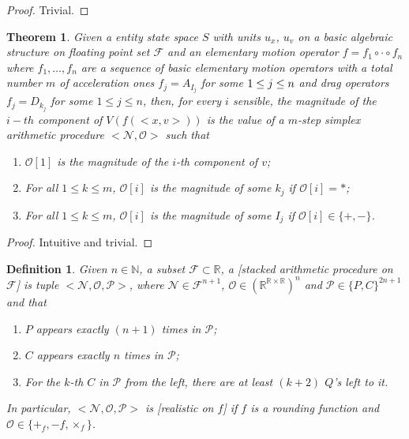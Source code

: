 \documentclass{book}
\newtheorem{definition}{Definition}
\newtheorem{theorem}{Theorem}
\theoremstyle{definition}\newtheorem{mechanism}{Mechanism}
\theoremstyle{remark}\newtheorem*{remark}{Remark}
\begin{document}
\begin{proof}
	Trivial.
\end{proof}

\begin{theorem}
	Given a entity state space $S$ with units $u_x$, $u_v$ on a basic algebraic structure on floating point set $\mathcal F$ and an elementary motion operator $f = f_1 \circ \cdot \circ f_n$ where $f_1, \dots, f_n$ are a sequence of basic elementary motion operators with a total number $m$ of acceleration ones $f_j = A_{I_j}$ for some $\\
	1\le j\le n$ and drag operators $f_j = D_{k_j}$ for some $1\le j\le n$, then, for every $i$ sensible, the magnitude of the $i-th$ component of $V(f(<x, v>))$ is the value of a $m$-step simplex arithmetic procedure $<\mathcal N, \mathcal O>$ such that
	
	\begin{enumerate}
		\item $\mathcal O[1]$ is the magnitude of the $i$-th component of $v$;
		\item For all $1\le k \le m$, $\mathcal O[i]$ is the magnitude of some $k_j$ if $\mathcal O[i] = *$;
		\item For all $1\le k \le m$, $\mathcal O[i]$ is the magnitude of some $I_j$ if $\mathcal O[i] \in \{ +, - \}$.
	\end{enumerate}
\end{theorem}

\begin{proof}
	Intuitive and trivial.
\end{proof}

\begin{definition}
	Given $n\in \mathbb N$, a subset $\mathcal F\subset \mathbb R$, a [stacked arithmetic procedure on $\mathcal F$] is tuple $<\mathcal N, \mathcal O, \mathcal P>$, where $\mathcal N \in \mathcal F^{n + 1}$, $\mathcal O\in (\mathbb R^{\mathbb R \times \mathbb R})^n$ and $\mathcal P\in \{ P, C \}^{2n + 1}$ and that
	
	\begin{enumerate}
		\item $P$ appears exactly $(n + 1)$ times in $\mathcal P$;
		\item $C$ appears exactly $n$ times in $\mathcal P$;
		\item For the $k$-th $C$ in $\mathcal P$ from the left, there are at least $(k + 2)$ $Q$'s left to it.
	\end{enumerate}
	
	In particular, $<\mathcal N, \mathcal O, \mathcal P>$ is [realistic on $f$] if $f$ is a rounding function and $\mathcal O \in \{ +_f, -f, \times_f \}$.
\end{definition}
\end{document}
